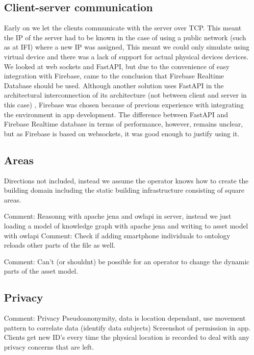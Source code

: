 \documentclass{article}
\begin{document}
\subsection{Client-server communication}\label{subsec:ClientServerCommunication}
Early on we let the clients communicate with the server over TCP. This meant the IP of the server had to be known in the case of using a public network (such as at IFI) where a new IP was assigned, This meant we could only simulate using virtual device and there was a lack of support for actual physical devices devices. We looked at web sockets and FastAPI, but due to the convenience of easy integration with Firebase, came to the conclusion that Firebase Realtime Database should be used. Although another solution uses FastAPI in the architectural interconnection of its architecture (not between client and server in this case) \cite{waszak_let_2022}, Firebase was chosen because of previous experience with integrating the environment in app development. The difference between FastAPI and Firebase Realtime database in terms of performance, however, remains unclear, but as Firebase is based on websockets, it was good enough to justify using it.

\subsection{Areas}
Directions not included, instead we assume the operator knows how to create the building domain including the static building infrastructure consisting of square areas.

Comment: Reasonng with apache jena and owlapi in server, instead we just loading a model of knowledge graph with apache jena and writing to asset model with owlapi
Comment: Check if adding smartphone individuals to ontology reloads other parts of the file as well.

Comment: Can't (or shouldnt) be possible for an operator to change the dynamic parts of the asset model.



\subsection{Privacy}\label{subsec:privacy}
Comment: Privacy
    Pseudoanonymity, data is location dependant, use movement pattern to correlate data (identify data subjects) Screenshot of permission in app.
Clients get new ID's every time the physical location is recorded to deal with any privacy concerns that are left.
\end{document}

